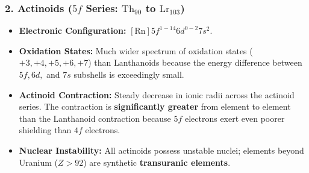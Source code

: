 \documentclass[10pt,a4paper]{article}
\begin{document}
\subsubsection{2. Actinoids ($5f$ Series: $\mathrm{Th_{90}}$ to $\mathrm{Lr_{103}}$)}
\begin{itemize}
  \item \textbf{Electronic Configuration:} $[\mathrm{Rn}] 5f^{1-14} 6d^{0-2} 7s^2$.
  \item \textbf{Oxidation States:} Much wider spectrum of oxidation states ($+3, +4, +5, +6, +7$) than Lanthanoids because the energy difference between $5f, 6d,$ and $7s$ subshells is exceedingly small.
  \item \textbf{Actinoid Contraction:} Steady decrease in ionic radii across the actinoid series. The contraction is \textbf{significantly greater} from element to element than the Lanthanoid contraction because $5f$ electrons exert even poorer shielding than $4f$ electrons.
  \item \textbf{Nuclear Instability:} All actinoids possess unstable nuclei; elements beyond Uranium ($Z > 92$) are synthetic \textbf{transuranic elements}.
\end{itemize}
\end{document}
